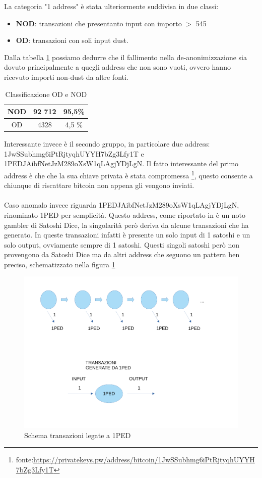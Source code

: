 La categoria "1 address" è stata ulteriormente suddivisa in due classi:
\begin{itemize}
    \item \textbf{NOD}: transazioni che presentanto input con importo $>$ 545  
    \item \textbf{OD}: transazioni con soli input dust.
\end{itemize}
Dalla tabella \ref{tab:OD_NOD_failed} possiamo dedurre che il fallimento nella de-anonimizzazione sia dovuto principalmente a quegli address che non sono vuoti, ovvero hanno ricevuto importi non-dust da altre fonti. 
\begin{table}[H]
    \centering
    \begin{tabular}{|c|c|c|}
        \hline
            NOD  & 92 712 & 95,5\%\\
        \hline 
            OD  & 4328 & 4,5 \%\\
        \hline
    \end{tabular}
    \caption{Classificazione OD e NOD}
    \label{tab:OD_NOD_failed}
\end{table}
Interessante invece è il secondo gruppo, in particolare due address: 1JwSSubhmg6iPtRjtyqhUYYH7bZg3Lfy1T e 1PEDJAibfNetJzM289oXsW1qLAgjYDjLgN. Il fatto interessante del primo address è che che la sua chiave privata è stata compromessa \footnote{fonte:\url{https://privatekeys.pw/address/bitcoin/1JwSSubhmg6iPtRjtyqhUYYH7bZg3Lfy1T}}, questo consente a chiunque di riscattare bitcoin non appena gli vengono inviati.\\\\
Caso anomalo invece riguarda 1PEDJAibfNetJzM289oXsW1qLAgjYDjLgN, rinominato 1PED per semplicità. Questo address, come riportato in \cite{dustAnalisi} è un noto gambler di Satoshi Dice, la singolarità però deriva da alcune transazioni che ha generato. In queste transazioni infatti è presente un solo input di 1 satoshi e un solo output, ovviamente sempre di 1 satoshi. Questi singoli satoshi però non provengono da Satoshi Dice ma da altri address che seguono un pattern ben preciso, schematizzato nella figura \ref{fig:1PED}
\begin{figure}[h!]
    \centering
    \includegraphics[scale=0.4]{Images/1Ped.pdf}
    \caption{Schema transazioni legate a 1PED}
    \label{fig:1PED}
\end{figure}
